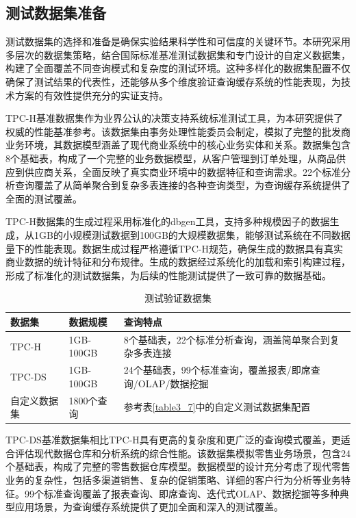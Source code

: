 \subsection{测试数据集准备}

测试数据集的选择和准备是确保实验结果科学性和可信度的关键环节。本研究采用多层次的数据集策略，结合国际标准基准测试数据集和专门设计的自定义数据集，构建了全面覆盖不同查询模式和复杂度的测试环境。这种多样化的数据集配置不仅确保了测试结果的代表性，还能够从多个维度验证查询缓存系统的性能表现，为技术方案的有效性提供充分的实证支持。

TPC-H基准数据集作为业界公认的决策支持系统标准测试工具，为本研究提供了权威的性能基准参考\cite{c50}。该数据集由事务处理性能委员会制定，模拟了完整的批发商业务环境，其数据模型涵盖了现代商业系统中的核心业务实体和关系。数据集包含8个基础表，构成了一个完整的业务数据模型，从客户管理到订单处理，从商品供应到供应商关系，全面反映了真实商业环境中的数据特征和查询需求。22个标准分析查询覆盖了从简单聚合到复杂多表连接的各种查询类型，为查询缓存系统提供了全面的测试覆盖。

TPC-H数据集的生成过程采用标准化的dbgen工具，支持多种规模因子的数据生成，从1GB的小规模测试数据到100GB的大规模数据集，能够测试系统在不同数据量下的性能表现。数据生成过程严格遵循TPC-H规范，确保生成的数据具有真实商业数据的统计特征和分布规律。生成的数据经过系统化的加载和索引构建过程，形成了标准化的测试数据集，为后续的性能测试提供了一致可靠的数据基础。

\begin{table}[!htb]
    \caption{测试验证数据集}
    \label{table6_2}
    \centering
    \begin{tabular}{p{3cm}p{3cm}p{7cm}}
        \hline
        数据集 & 数据规模 & 查询特点 \\
        \hline
        TPC-H      & 1GB-100GB & 8个基础表，22个标准分析查询，涵盖简单聚合到复杂多表连接 \\
        TPC-DS     & 1GB-100GB & 24个基础表，99个标准查询，覆盖报表/即席查询/OLAP/数据挖掘 \\
        自定义数据集 & 1800个查询 & 参考表\ref{table3_7}中的自定义测试数据集配置 \\
        \hline
    \end{tabular}
\end{table}

TPC-DS基准数据集相比TPC-H具有更高的复杂度和更广泛的查询模式覆盖，更适合评估现代数据仓库和分析系统的综合性能\cite{c51}。该数据集模拟零售业务场景，包含24个基础表，构成了完整的零售数据仓库模型。数据模型的设计充分考虑了现代零售业务的复杂性，包括多渠道销售、复杂的促销策略、详细的客户行为分析等业务特征。99个标准查询覆盖了报表查询、即席查询、迭代式OLAP、数据挖掘等多种典型应用场景，为查询缓存系统提供了更加全面和深入的测试覆盖。


